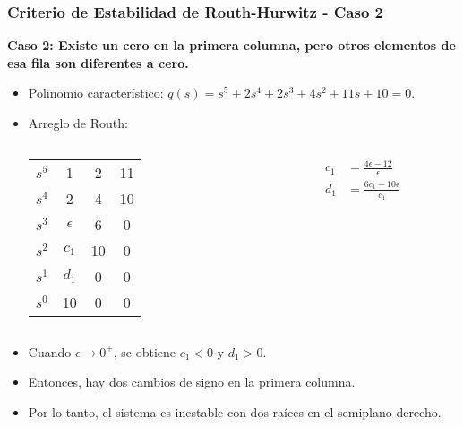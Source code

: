 \documentclass[aspectratio=169,handout]{beamer}
\theoremstyle{definition}
\theoremstyle{plain}
\theoremstyle{remark}
\begin{document}
\begin{frame}[<+->]\frametitle{Criterio de Estabilidad de Routh-Hurwitz - Caso 2}
\textbf{Caso 2: Existe un cero en la primera columna, pero otros elementos de esa fila son diferentes a cero.}
\begin{itemize}
	\item Polinomio característico: $q(s) = s^5 + 2s^4 + 2s^3 + 4s^2 + 11s + 10 = 0$.
	\item Arreglo de Routh:\\
	\centering	
	\begin{columns}
	\begin{column}{0.2\textwidth}
	\begin{tabular}{c|ccc}
		$s^5$ & 1 & 2 & 11\\
		$s^4$ & 2 & 4 & 10\\
		$s^3$ & $\epsilon$ & 6 & 0\\
		$s^2$ & $c_1$ & 10 & 0\\
		$s^1$ & $d_1$ & 0 & 0\\
		$s^0$ & 10 & 0 & 0
	\end{tabular}
	\end{column}	
	\begin{column}{0.2\textwidth}
	\begin{align*}
		c_1 &= \frac{4\epsilon - 12}{\epsilon}\\
		d_1 &= \frac{6c_1 - 10\epsilon}{c_1}
	\end{align*}
	\end{column}	
	\end{columns}
	\item Cuando $\epsilon \rightarrow 0^+$, se obtiene $c_1 < 0$ y $d_1 > 0$.
	\item Entonces, hay dos cambios de signo en la primera columna.
	\item Por lo tanto, el sistema es inestable con dos raíces en el semiplano derecho.
\end{itemize}
\end{frame}
\end{document}
